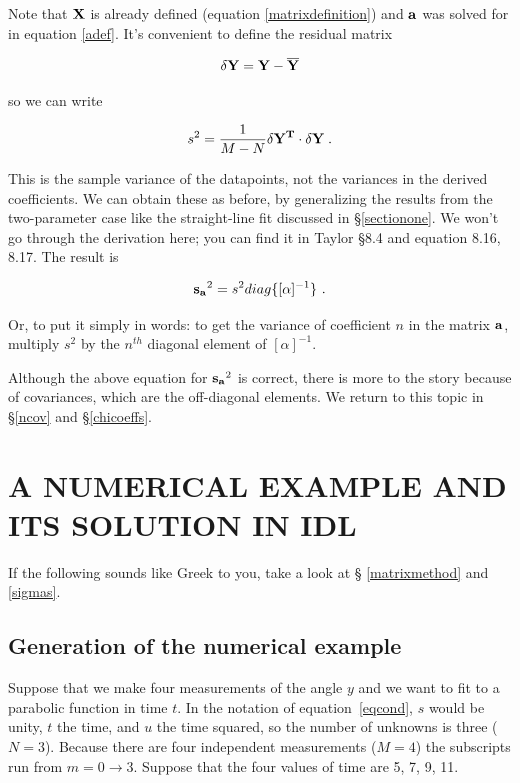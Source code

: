 \documentclass[psfig,preprint]{aastex}
\begin{document}
\noindent Note that ${\bf X}$ is already defined (equation
\ref{matrixdefinition}) and ${\bf a}$ was solved for in equation
\ref{adef}. It's convenient to define the residual matrix

\begin{equation}
{\bf \delta Y } = {\bf Y - \overline{ Y}}
\end{equation}

\noindent so we can write

\begin{equation} \label{samplevariancetwo}
s^2 = {1 \over M - N} {\bf \delta Y^T \cdot \delta Y} \; . 
\end{equation}

	This is the sample variance of the datapoints, not the variances
in the derived coefficients. We can obtain these as before, by
generalizing the results from the two-parameter case like the
straight-line fit discussed in \S \ref{sectionone}. We won't go through
the derivation here; you can find it in Taylor \S 8.4 and equation 8.16,
8.17. The result is

\begin{equation} \label{coeffvarianceone}
{\bf s_a}^2 = s^2 diag \{[\alpha]^{-1} \} \ .
\end{equation}

\noindent Or, to put it simply in words: to get the variance of 
coefficient $n$ in the matrix ${\bf a}$, multiply $s^2$ by the $n^{th}$
diagonal element of $[\alpha]^{-1}$. 

	Although the above equation for ${\bf s_a}^2$ is correct, there
is more to the story because of covariances, which are the off-diagonal
elements. We return to this topic in \S \ref{ncov} and \S \ref{chicoeffs}. 

\section{A NUMERICAL EXAMPLE AND ITS SOLUTION IN IDL} \label{numexample}

	If the following sounds like Greek to you, take a look at \S
\ref{matrixmethod} and \ref{sigmas}.

\subsection{Generation of the numerical example}

	Suppose that we make four measurements of the angle $y$ and
we want to fit to a parabolic function in time $t$.  In the notation of
equation~\ref{eqcond}, $s$ would be unity, $t$ the time, and $u$ the
time squared, so the number of unknowns is three ($N=3$).  Because there
are four independent measurements ($M=4$) the subscripts run from $m = 0
\rightarrow 3$.  Suppose that the four values of time are 5, 7, 9, 11. 
\end{document}

